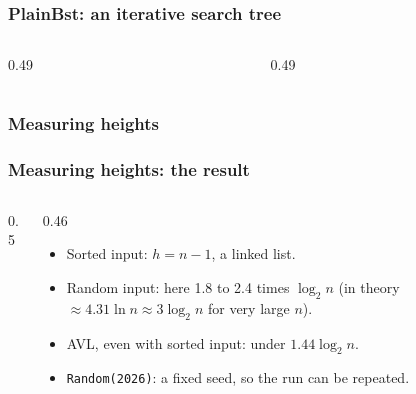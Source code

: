 \documentclass[aspectratio=169,10pt,compress]{beamer}
\begin{document}
\begin{frame}[t,fragile] \frametitle{PlainBst: an iterative search tree}
  \begin{columns}[T]
    \begin{column}{0.49\textwidth}
    \end{column}
    \begin{column}{0.49\textwidth}
    \end{column}
  \end{columns}
\end{frame}




\begin{frame}[t,fragile] \frametitle{Measuring heights}
\end{frame}




\begin{frame}[t,fragile] \frametitle{Measuring heights: the result}
  \begin{columns}[T]
    \begin{column}{0.5\textwidth}
    \end{column}
    \begin{column}{0.46\textwidth}
      \begin{itemize}\small
        \item Sorted input: $h = n - 1$, a linked list.
        \item Random input: here 1.8 to 2.4 times $\log_{2} n$ (in theory $\approx 4.31 \ln n \approx 3 \log_{2} n$ for very large $n$).
        \item AVL, even with sorted input: under $1.44 \log_{2} n$.
        \item \texttt{Random(2026)}: a fixed seed, so the run can be repeated.
      \end{itemize}
    \end{column}
  \end{columns}
\end{frame}
\end{document}
